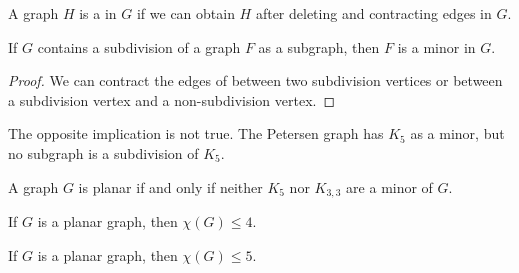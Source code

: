 
\begin{definition}
  A graph $H$ is a  in $G$ if we can obtain $H$ after deleting and
  contracting edges in $G$.
\end{definition}

\begin{proposition}
  If $G$ contains a subdivision of a graph $F$ as a subgraph, then $F$ is a
  minor in $G$.
\end{proposition}

\begin{proof}
  We can contract the edges of between two subdivision vertices or between a
  subdivision vertex and a non-subdivision vertex.
\end{proof}

\begin{remark}
  The opposite implication is not true.
  The Petersen graph has $K_5$ as a minor, but no subgraph is a subdivision of
  $K_5$.
\end{remark}


\begin{theorem}[Wagner]
  A graph $G$ is planar if and only if neither $K_5$ nor $K_{3,3}$ are a minor
  of $G$.
\end{theorem}


\begin{theorem}
  If $G$ is a planar graph, then $\chi(G) \le 4$.
\end{theorem}

\begin{theorem}
  If $G$ is a planar graph, then $\chi(G) \le 5$.
\end{theorem}

